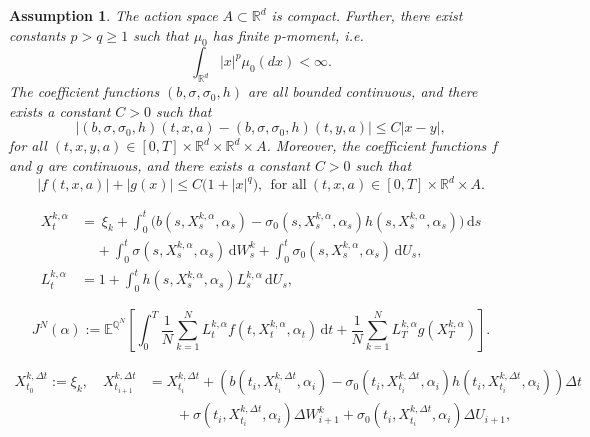 \documentclass[10pt,a4paper]{amsart}
\newtheorem{assumption}{Assumption}
\newcommand{\R}{\mathbb{R}}
\newcommand{\dd}{\mathrm{d}}
\newcommand{\x}{\times}
\begin{document}
	\begin{assumption} \label{assum:coeff}
		The action space $A \subset \R^d$ is compact.
		Further, there exist constants $p > q \ge 1$ such that $\mu_0$ has finite $p$-moment, i.e. 
		$$
		\int_{\R^d} |x|^p \mu_0(dx) < \infty.
		$$
		The coefficient functions $(b, \sigma, \sigma_0, h)$ are all bounded continuous, and there exists a constant $C> 0$ such that
		$$
		\big| (b, \sigma, \sigma_0, h) (t,x,a) - (b, \sigma, \sigma_0, h)(t,y,a) \big| 
		\le 
		C |x-y|,
		$$
		for all $(t,x,y,a) \in [0,T] \x \R^d \x \R^d \x A$.
		Moreover, the coefficient functions $f$ and $g$ are continuous, and there exists a constant $C> 0$ such that
		\begin{equation} \label{eq:growth_rg}
			\big| f(t,x,a) \big| + \big| g(x) \big| 
			\le
			C \big(1+ |x|^q \big),
			~~\mbox{for all}~
			(t,x,a) \in [0,T] \x \R^d \x A.
		\end{equation}
	\end{assumption}

	\begin{align} 
		X_t^{k,\alpha} &=~ \xi_k + \int_0^t \Big(b(s, X_s^{k,\alpha},  \alpha_s) - \sigma_0(s,X_s^{k,\alpha}, \alpha_s) h(s, X_s^{k,\alpha}, \alpha_s) \Big) \,\dd s \nonumber \\
		&~~~~~+ \int_0^t \sigma(s,X_s^{k,\alpha}, \alpha_s)\,\dd W_s^{k} + \int_0^t \sigma_0(s, X_s^{k, \alpha}, \alpha_s)\,\dd U_s, \label{eq:SDE_XN} \\
		L_t^{k,\alpha} &= 1 + \int_0^t  h(s, X_s^{k,\alpha}, \alpha_s) L_s^{k,\alpha} \,\dd U_s, \label{eq:SDE_LN}
	\end{align}

	\begin{equation} \label{eq:defJN}
		J^N(\alpha)
		:=
		\mathbb{E}^{\mathbb{Q}^N}\left[ \int_0^T \frac{1}{N}\sum_{k=1}^N L_t^{k,\alpha} f(t, X_t^{k,\alpha}, \alpha_t)\,\dd t + \frac{1}{N}\sum_{k=1}^N L_T^{k,\alpha} g(X_T^{k,\alpha}) \right].
	\end{equation}

	\begin{align} \label{eq:SDE_X_euler}
		X^{k,\Delta t}_{t_0} := \xi_k,
		\quad
		X_{t_{i+1}}^{k,\Delta t} &= X_{t_i}^{k,\Delta t} + \left(b(t_i, X_{t_i}^{k,\Delta t}, \alpha_i) - \sigma_0(t_i,X_{t_i}^{k,\Delta t}, \alpha_i)h(t_i,X_{t_i}^{k,\Delta t}, \alpha_i) \right)\Delta t  \nonumber \\
		&\qquad  + \sigma(t_i, X_{t_i}^{k,\Delta t}, \alpha_i)\Delta W_{i+1}^k + \sigma_0(t_i,X_{t_i}^{k,\Delta t}, \alpha_i)\Delta U_{i+1},
	\end{align}
\end{document}
